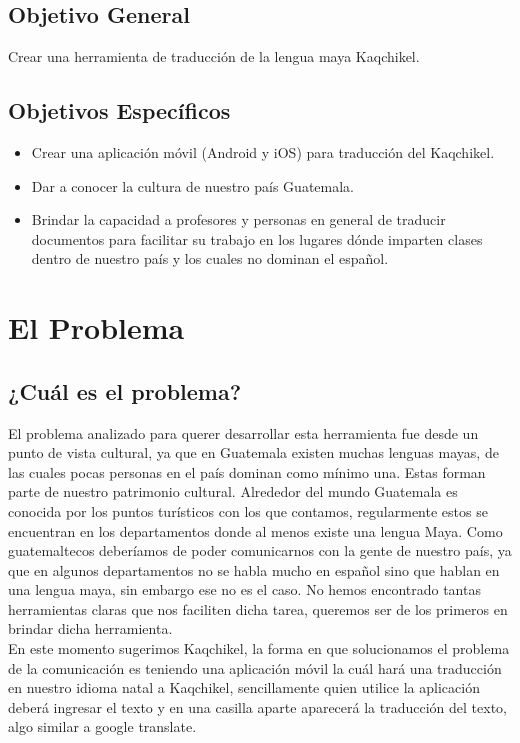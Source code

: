 \documentclass[a4paper,openright,11pt]{article}
\begin{document}
\subsection{Objetivo General}
Crear una herramienta de traducci\'on de la lengua maya Kaqchikel.
\subsection{Objetivos Espec\'ificos}
\begin{itemize}
    \item Crear una aplicaci\'on m\'ovil (Android y iOS) para traducción del Kaqchikel.
    \item Dar a conocer la cultura de nuestro pa\'is Guatemala.
    \item Brindar la capacidad a profesores y personas en general de traducir documentos para facilitar su trabajo en los lugares d\'onde imparten clases dentro de nuestro pa\'is y los cuales no dominan el espa\~nol.
\end{itemize}
\newpage

\section{El Problema}
\subsection{¿Cuál es el problema?}
El problema analizado para querer desarrollar esta herramienta fue desde un punto de vista cultural, ya que en Guatemala existen muchas lenguas mayas, de las cuales pocas personas en el pa\'is dominan como m\'inimo una. Estas forman parte de nuestro patrimonio cultural. Alrededor del mundo Guatemala es conocida por los puntos tur\'isticos con los que contamos, regularmente estos se encuentran en los departamentos donde al menos existe una lengua Maya.  Como guatemaltecos deber\'iamos de poder comunicarnos con la gente de nuestro pa\'is, ya que en algunos departamentos no se habla mucho en espa\~nol sino que hablan en una lengua maya, sin embargo ese no es el caso. No hemos encontrado tantas herramientas claras que nos faciliten dicha tarea, queremos ser de los primeros en brindar dicha herramienta.\\

En este momento sugerimos Kaqchikel, la forma en que solucionamos el problema de la comunicación es teniendo una aplicación m\'ovil la cu\'al har\'a una traducción en nuestro idioma natal a Kaqchikel, sencillamente quien utilice la aplicación deberá ingresar el texto y en una casilla aparte aparecer\'a la traducci\'on del texto, algo similar a google translate.\\
\end{document}
